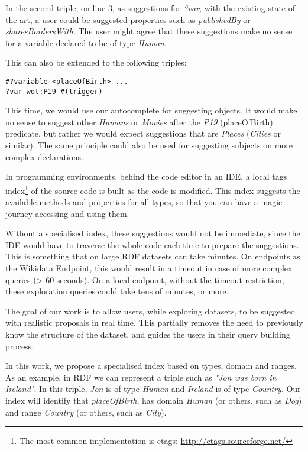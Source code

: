 In the second triple, on line 3, as suggestions for \textit{?var}, with the existing state of the art, a user could be suggested properties such as \textit{publishedBy} or \textit{sharesBordersWith}. 
The user might agree that these suggestions make no sense for a variable declared to be of type \textit{Human}. 

This can also be extended to the following triples:

\begin{verbatim}
#?variable <placeOfBirth> ...
?var wdt:P19 #(trigger)
\end{verbatim}

This time, we would use our autocomplete for suggesting objects. 
It would make no sense to suggest other \textit{Humans} or \textit{Movies} after the \textit{P19} (placeOfBirth) predicate, but rather we would expect suggestions that are \textit{Places} (\textit{Cities} or similar). 
The same principle could also be used for suggesting subjects on more complex declarations.

In programming environments, behind the code editor in an IDE, a local tags index\footnote{The most common implementation is ctags: \url{http://ctags.sourceforge.net/}} of the source code is built as the code is modified. 
This index suggests the available methods and properties for all types, so that you can have a magic journey accessing and using them.

Without a specialised index, these suggestions would not be immediate, since the IDE would have to traverse the whole code each time to prepare the suggestions. 
This is something that on large RDF datasets can take minutes. 
On endpoints as the Wikidata Endpoint, this would result in a timeout in case of more complex queries (> 60 seconds). 
On a local endpoint, without the timeout restriction, these exploration queries could take tens of minutes, or more. 

The goal of our work is to allow users, while exploring datasets, to be suggested with realistic proposals in real time. 
This partially removes the need to previously know the structure of the dataset, and guides the users in their query building process.

In this work, we propose a specialised index based on types, domain and ranges. 
As an example, in RDF we can represent a triple such as \textit{"Jon was born in Ireland"}. 
In this triple, \textit{Jon} is of type \textit{Human} and \textit{Ireland} is of type \textit{Country}. 
Our index will identify that \textit{placeOfBirth}, has domain \textit{Human} (or others, such as \textit{Dog}) and range \textit{Country} (or others, such as \textit{City}). 

